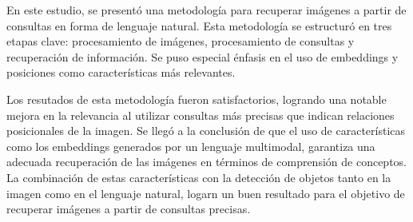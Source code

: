 \begin{conclusions}
    En este estudio, se presentó una metodología para recuperar imágenes a partir de consultas en forma de lenguaje natural. Esta metodología se estructuró en tres etapas clave: procesamiento de imágenes, procesamiento de consultas y recuperación de información. Se puso especial énfasis en el uso de embeddings y posiciones como características más relevantes.
    
    Los resutados de esta metodología fueron satisfactorios, logrando una notable mejora en la relevancia al utilizar consultas más precisas que indican relaciones posicionales de la imagen. Se llegó a la conclusión de que el uso de características como los embeddings generados por un lenguaje multimodal, garantiza una adecuada recuperación de las imágenes en términos de comprensión de conceptos. La combinación de estas características con la detección de objetos tanto en la imagen como en el lenguaje natural, logarn un buen resultado para el objetivo de recuperar imágenes a partir de consultas precisas.
    \end{conclusions}
    
    